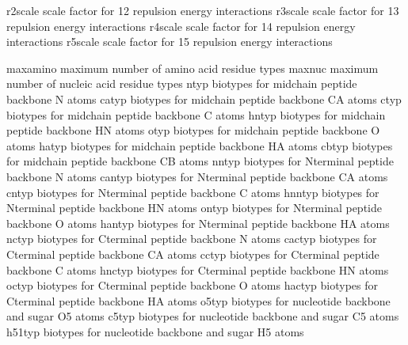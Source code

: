 \documentclass[letterpaper,11pt,english]{sphinxmanual}
\begin{document}
\sphinxAtStartPar
{}

\begin{sphinxVerbatim}[commandchars=\\\{\}]
r2scale         scale factor for 1\PYGZhy{}2 repulsion energy interactions
r3scale         scale factor for 1\PYGZhy{}3 repulsion energy interactions
r4scale         scale factor for 1\PYGZhy{}4 repulsion energy interactions
r5scale         scale factor for 1\PYGZhy{}5 repulsion energy interactions
\end{sphinxVerbatim}

\sphinxAtStartPar
{}

\begin{sphinxVerbatim}[commandchars=\\\{\}]
maxamino        maximum number of amino acid residue types
maxnuc          maximum number of nucleic acid residue types
ntyp            biotypes for mid\PYGZhy{}chain peptide backbone N atoms
catyp           biotypes for mid\PYGZhy{}chain peptide backbone CA atoms
ctyp            biotypes for mid\PYGZhy{}chain peptide backbone C atoms
hntyp           biotypes for mid\PYGZhy{}chain peptide backbone HN atoms
otyp            biotypes for mid\PYGZhy{}chain peptide backbone O atoms
hatyp           biotypes for mid\PYGZhy{}chain peptide backbone HA atoms
cbtyp           biotypes for mid\PYGZhy{}chain peptide backbone CB atoms
nntyp           biotypes for N\PYGZhy{}terminal peptide backbone N atoms
cantyp          biotypes for N\PYGZhy{}terminal peptide backbone CA atoms
cntyp           biotypes for N\PYGZhy{}terminal peptide backbone C atoms
hnntyp          biotypes for N\PYGZhy{}terminal peptide backbone HN atoms
ontyp           biotypes for N\PYGZhy{}terminal peptide backbone O atoms
hantyp          biotypes for N\PYGZhy{}terminal peptide backbone HA atoms
nctyp           biotypes for C\PYGZhy{}terminal peptide backbone N atoms
cactyp          biotypes for C\PYGZhy{}terminal peptide backbone CA atoms
cctyp           biotypes for C\PYGZhy{}terminal peptide backbone C atoms
hnctyp          biotypes for C\PYGZhy{}terminal peptide backbone HN atoms
octyp           biotypes for C\PYGZhy{}terminal peptide backbone O atoms
hactyp          biotypes for C\PYGZhy{}terminal peptide backbone HA atoms
o5typ           biotypes for nucleotide backbone and sugar O5\PYGZsq{} atoms
c5typ           biotypes for nucleotide backbone and sugar C5\PYGZsq{} atoms
h51typ          biotypes for nucleotide backbone and sugar H5\PYGZsq{} atoms

\end{sphinxVerbatim}
\end{document}
